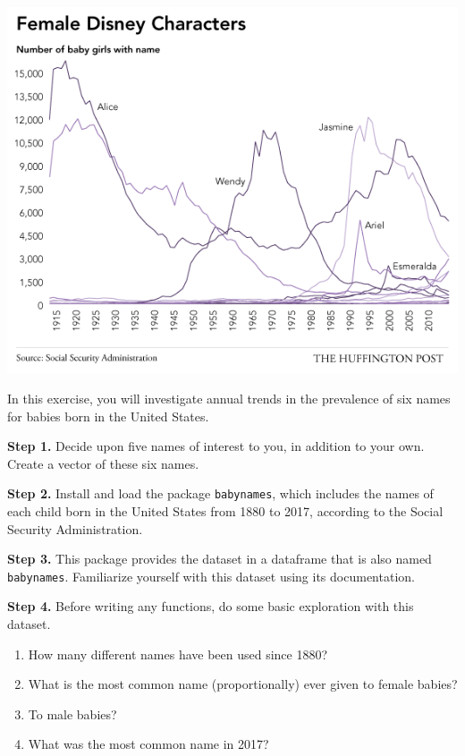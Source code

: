 \documentclass[
]{book}
\providecommand{\tightlist}{%
  \setlength{\itemsep}{0pt}\setlength{\parskip}{0pt}}
\begin{document}
\includegraphics{img/baby_names.png}

In this exercise, you will investigate annual trends in the prevalence of six names for babies born in the United States.

\textbf{Step 1.} Decide upon five names of interest to you, in addition to your own. Create a vector of these six names.

\textbf{Step 2.} Install and load the package \texttt{babynames}, which includes the names of each child born in the United States from 1880 to 2017, according to the Social Security Administration.

\textbf{Step 3.} This package provides the dataset in a dataframe that is also named \texttt{babynames}. Familiarize yourself with this dataset using its documentation.

\textbf{Step 4.} Before writing any functions, do some basic exploration with this dataset.

\begin{enumerate}
\def\labelenumi{(\alph{enumi})}
\tightlist
\item
  How many different names have been used since 1880?\\
\item
  What is the most common name (proportionally) ever given to female babies?
\item
  To male babies?
\item
  What was the most common name in 2017?
\end{enumerate}
\end{document}
